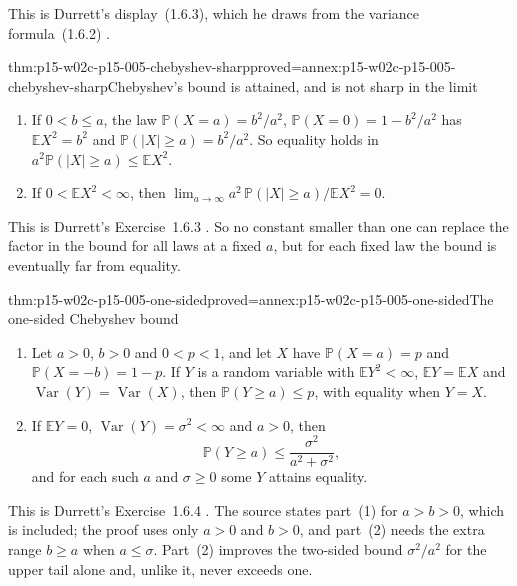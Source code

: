 This is Durrett's display~(1.6.3), which he draws from the variance
formula~(1.6.2) \cite[p.~33]{DurrettPTEAuthor2019}.

\begin{hbtheorem}{thm:p15-w02c-p15-005-chebyshev-sharp}{proved=annex:p15-w02c-p15-005-chebyshev-sharp}{Chebyshev's bound is attained, and is not sharp in the limit}
\par\nobreak
\begin{enumerate}
\item If \(0<b\leq a\), the law
      \(\mathbb P(X=a)=b^2/a^2\), \(\mathbb P(X=0)=1-b^2/a^2\) has
      \(\mathbb EX^2=b^2\) and \(\mathbb P(|X|\geq a)=b^2/a^2\). So
      equality holds in \(a^2\mathbb P(|X|\geq a)\leq\mathbb EX^2\).
\item If \(0<\mathbb EX^2<\infty\), then
      \(\lim_{a\to\infty}a^2\,\mathbb P(|X|\geq a)/\mathbb EX^2=0\).
\end{enumerate}
\end{hbtheorem}

This is Durrett's Exercise~1.6.3 \cite[p.~35]{DurrettPTEAuthor2019}.
So no constant smaller than one can replace the factor in the bound for
all laws at a fixed \(a\), but for each fixed law the bound is eventually
far from equality.

\begin{hbtheorem}{thm:p15-w02c-p15-005-one-sided}{proved=annex:p15-w02c-p15-005-one-sided}{The one-sided Chebyshev bound}
\par\nobreak
\begin{enumerate}
\item Let \(a>0\), \(b>0\) and \(0<p<1\), and let \(X\) have
      \(\mathbb P(X=a)=p\) and \(\mathbb P(X=-b)=1-p\). If \(Y\) is a
      random variable with \(\mathbb EY^2<\infty\),
      \(\mathbb EY=\mathbb EX\) and
      \(\operatorname{Var}(Y)=\operatorname{Var}(X)\), then
      \(\mathbb P(Y\geq a)\leq p\), with equality when \(Y=X\).
\item If \(\mathbb EY=0\), \(\operatorname{Var}(Y)=\sigma^2<\infty\)
      and \(a>0\), then
      \[
       \mathbb P(Y\geq a)\leq\frac{\sigma^2}{a^2+\sigma^2},
      \]
      and for each such \(a\) and \(\sigma\geq0\) some \(Y\) attains
      equality.
\end{enumerate}
\end{hbtheorem}

This is Durrett's Exercise~1.6.4 \cite[p.~36]{DurrettPTEAuthor2019}.
The source states part~(1) for \(a>b>0\), which is included; the proof
uses only \(a>0\) and \(b>0\), and part~(2) needs the extra range
\(b\geq a\) when \(a\leq\sigma\). Part~(2) improves the two-sided bound
\(\sigma^2/a^2\) for the upper tail alone and, unlike it, never
exceeds one.

